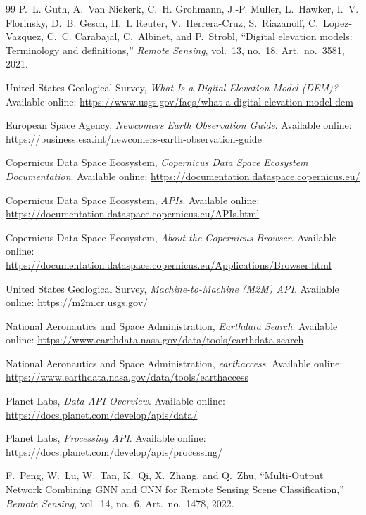 \documentclass[11pt,a4paper]{article}
\begin{document}
\begin{thebibliography}{99}
P.~L. Guth, A.~Van Niekerk, C.~H. Grohmann, J.-P. Muller,
L.~Hawker, I.~V. Florinsky, D.~B. Gesch, H.~I. Reuter,
V.~Herrera-Cruz, S.~Riazanoff, C.~Lopez-Vazquez,
C.~C. Carabajal, C.~Albinet, and P.~Strobl,
``Digital elevation models: Terminology and definitions,''
\textit{Remote Sensing},
vol.~13, no.~18, Art.~no.~3581, 2021.

United States Geological Survey,
\textit{What Is a Digital Elevation Model (DEM)?}
Available online:
\url{https://www.usgs.gov/faqs/what-a-digital-elevation-model-dem}

European Space Agency,
\textit{Newcomers Earth Observation Guide}.
Available online:
\url{https://business.esa.int/newcomers-earth-observation-guide}

Copernicus Data Space Ecosystem,
\textit{Copernicus Data Space Ecosystem Documentation}.
Available online:
\url{https://documentation.dataspace.copernicus.eu/}

Copernicus Data Space Ecosystem,
\textit{APIs}.
Available online:
\url{https://documentation.dataspace.copernicus.eu/APIs.html}

Copernicus Data Space Ecosystem,
\textit{About the Copernicus Browser}.
Available online:
\url{https://documentation.dataspace.copernicus.eu/Applications/Browser.html}

United States Geological Survey,
\textit{Machine-to-Machine (M2M) API}.
Available online:
\url{https://m2m.cr.usgs.gov/}

National Aeronautics and Space Administration,
\textit{Earthdata Search}.
Available online:
\url{https://www.earthdata.nasa.gov/data/tools/earthdata-search}

National Aeronautics and Space Administration,
\textit{earthaccess}.
Available online:
\url{https://www.earthdata.nasa.gov/data/tools/earthaccess}

Planet Labs,
\textit{Data API Overview}.
Available online:
\url{https://docs.planet.com/develop/apis/data/}

Planet Labs,
\textit{Processing API}.
Available online:
\url{https://docs.planet.com/develop/apis/processing/}

F.~Peng, W.~Lu, W.~Tan, K.~Qi, X.~Zhang, and Q.~Zhu,
``Multi-Output Network Combining GNN and CNN for Remote Sensing Scene Classification,''
\textit{Remote Sensing},
vol.~14, no.~6, Art.~no.~1478, 2022.


\end{thebibliography}
\end{document}
